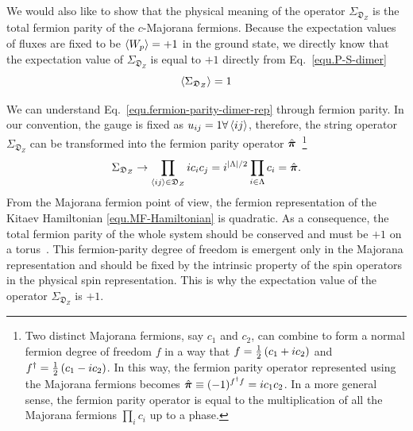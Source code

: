 We would also like to show that the physical meaning of the operator $\Sigma_{\mathfrak{D}_Z}$ is the total fermion parity of the $c$-Majorana fermions. Because the expectation values of fluxes are fixed to be $\left\langle W_p \right\rangle=+1$ in the ground state, we directly know that the expectation value of $\Sigma_{\mathfrak{D}_Z}$ is equal to $+1$ directly from Eq.~\eqref{equ.P-S-dimer} 
\begin{equation}\label{equ.fermion-parity-dimer-rep}
    \left\langle \Sigma_{\mathfrak{D}_Z} \right\rangle=1
\end{equation}

We can understand Eq.~\eqref{equ.fermion-parity-dimer-rep} through fermion parity. In our convention, the gauge is fixed as $u_{ij}=1\forall\left\langle ij \right\rangle$, therefore, the string operator $\Sigma_{\mathfrak{D}_Z}$ can be transformed into the fermion parity operator $\hat{\boldsymbol{\pi}}$~\footnote{Two distinct Majorana fermions, say $c_1$ and $c_2$, can combine to form a normal fermion degree of freedom $f$ in a way that $f=\frac{1}{2}\left( c_1+ic_2 \right)$ and $f^\dagger=\frac{1}{2}\left( c_1-ic_2 \right)$. In this way, the fermion parity operator represented using the Majorana fermions becomes $\hat{\boldsymbol{\pi}}\equiv(-1)^{f^\dagger f}=ic_1c_2$. In a more general sense, the fermion parity operator is equal to the multiplication of all the Majorana fermions $\prod_i c_i$ up to a phase.}
\begin{equation}\label{equ.total-fermion-parity-Sigma-Z}
    \Sigma_{\mathfrak{D}_Z} \to \prod_{\left\langle ij \right\rangle\in\mathfrak{D}_Z}ic_ic_j= i^{\abs{\Lambda}/2} \prod_{i\in\Lambda}c_i = \hat{\boldsymbol{\pi}}.
\end{equation} 
From the Majorana fermion point of view, the fermion representation of the Kitaev Hamiltonian \eqref{equ.MF-Hamiltonian} is quadratic. As a consequence, the total fermion parity of the whole system should be conserved and must be $+1$ on a torus~\cite{Fu-Knolle-Perkins-2018}. This fermion-parity degree of freedom is emergent only in the Majorana representation and should be fixed by the intrinsic property of the spin operators in the physical spin representation. This is why the expectation value of the operator $\Sigma_{\mathfrak{D}_Z}$ is $+1$. 
